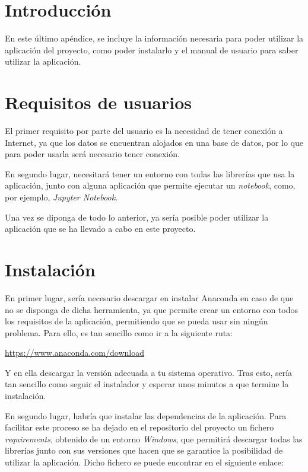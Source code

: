 
\section{Introducción}
En este último apéndice, se incluye la información necesaria para poder utilizar la aplicación del proyecto, como poder instalarlo y el manual de usuario para saber utilizar la aplicación.

\section{Requisitos de usuarios}
El primer requisito por parte del usuario es la necesidad de tener conexión a Internet, ya que los datos se encuentran alojados en una base de datos, por lo que para poder usarla será necesario tener conexión.

En segundo lugar, necesitará tener un entorno con todas las librerías que usa la aplicación, junto con alguna aplicación que permite ejecutar un \emph{notebook}, como, por ejemplo, \emph{Jupyter Notebook}.

Una vez se diponga de todo lo anterior, ya sería posible poder utilizar la aplicación que se ha llevado a cabo en este proyecto.

\section{Instalación}
En primer lugar, sería necesario descargar en instalar Anaconda en caso de que no se disponga de dicha herramienta, ya que permite crear un entorno con todos los requisitos de la aplicación, permitiendo que se pueda usar sin ningún problema. Para ello, es tan sencillo como ir a la siguiente ruta:

\url{https://www.anaconda.com/download}

Y en ella descargar la versión adecuada a tu sistema operativo. Tras esto, sería tan sencillo como seguir el instalador y esperar unos minutos a que termine la instalación.

En segundo lugar, habría que instalar las dependencias de la aplicación. Para facilitar este proceso se ha dejado en el repositorio del proyecto un fichero \emph{requirements}, obtenido de un entorno \emph{Windows}, que permitirá descargar todas las librerías junto con sus versiones que hacen que se garantice la posibilidad de utilizar la aplicación. Dicho fichero se puede encontrar en el siguiente enlace:

